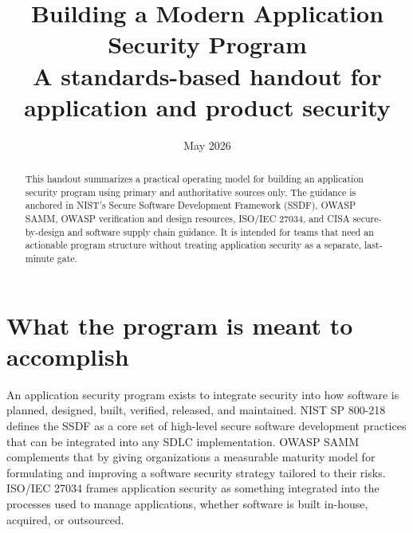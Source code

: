 \documentclass[11pt]{article}
\title{\vspace{-1.2em}Building a Modern Application Security Program\\\large A standards-based handout for application and product security}
\author{}
\date{May 2026}
\begin{document}
\maketitle
\thispagestyle{fancy}
\vspace{-2.0em}

\begin{abstract}
\noindent This handout summarizes a practical operating model for building an application security program using primary and authoritative sources only. The guidance is anchored in NIST's Secure Software Development Framework (SSDF), OWASP SAMM, OWASP verification and design resources, ISO/IEC 27034, and CISA secure-by-design and software supply chain guidance. It is intended for teams that need an actionable program structure without treating application security as a separate, last-minute gate.\cite{nist-ssdf,owasp-samm,iso-27034,cisa-sbd}
\end{abstract}

\section{What the program is meant to accomplish}
An application security program exists to integrate security into how software is planned, designed, built, verified, released, and maintained. NIST SP 800-218 defines the SSDF as a core set of high-level secure software development practices that can be integrated into any SDLC implementation. OWASP SAMM complements that by giving organizations a measurable maturity model for formulating and improving a software security strategy tailored to their risks. ISO/IEC 27034 frames application security as something integrated into the processes used to manage applications, whether software is built in-house, acquired, or outsourced.\cite{nist-ssdf,owasp-samm,iso-27034}
\end{document}
